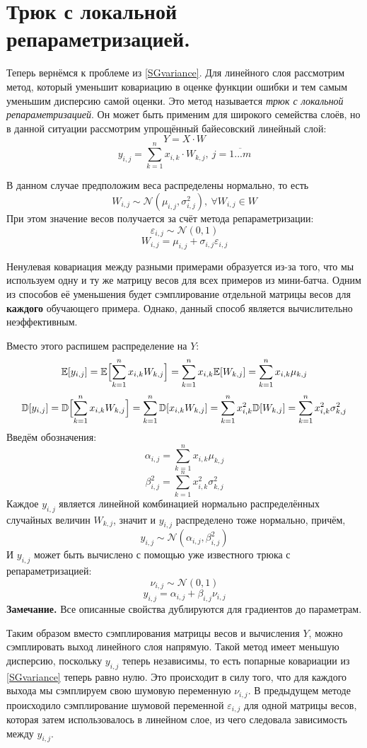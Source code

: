 \section{Трюк с локальной репараметризацией.}

Теперь вернёмся к проблеме из \ref{SGvariance}. Для линейного слоя рассмотрим метод, который уменьшит ковариацию в оценке функции ошибки и тем самым уменьшим
 дисперсию самой оценки. Это метод\cite{localRT} называется \textit{трюк с локальной репараметризацией}. Он может быть применим для широкого семейства слоёв,
 но в данной ситуации рассмотрим упрощённый байесовский линейный слой:
$$Y = X \cdot W$$
$$y_{i,j} = \sum_{k=1}^n x_{i,k} \cdot W_{k,j},\ j=\overline{1...m}$$

В данном случае предположим веса распределены нормально, то есть
$$W_{i,j} \sim \mathcal{N}(\mu_{i,j}, \sigma_{i,j}^2),\ \forall W_{i,j} \in W$$
При этом значение весов получается за счёт метода репараметризации:
$$\varepsilon_{i,j} \sim \mathcal{N}(0,1)$$
$$W_{i,j} = \mu_{i,j} + \sigma_{i,j}\varepsilon_{i,j}$$

Ненулевая ковариация между разными примерами образуется из-за того, что мы используем одну и ту же матрицу весов для всех примеров из мини-батча.
 Одним из способов её уменьшения будет сэмплирование отдельной матрицы весов для \textbf{каждого} обучающего примера. Однако, данный способ является
 вычислительно неэффективным.

Вместо этого распишем распределение на $Y$:
$$\mathbb{E}[y_{i,j}] = \mathbb{E}\Bigl[\sum_{k=1}^n x_{i,k}W_{k,j}\Bigr]=\sum_{k=1}^n x_{i,k} \mathbb{E}[W_{k,j}]=\sum_{k=1}^n x_{i,k}\mu_{k,j}$$
$$\mathbb{D}[y_{i,j}] = \mathbb{D}\Bigl[\sum_{k=1}^n x_{i,k}W_{k,j}\Bigr]=\sum_{k=1}^n \mathbb{D}[x_{i,k}W_{k,j}]=\sum_{k=1}^n x_{i,k}^2 \mathbb{D}[W_{k,j}]=\sum_{k=1}^n x_{i,k}^2\sigma_{k,j}^2$$
Введём обозначения:
$$\alpha_{i,j} = \sum_{k=1}^n x_{i,k}\mu_{k,j}$$
$$\beta_{i,j}^2 = \sum_{k=1}^n x_{i,k}^2\sigma_{k,j}^2$$
Каждое $y_{i,j}$ является линейной комбинацией нормально распределённых случайных величин $W_{k, j}$, значит и $y_{i,j}$ распределено тоже нормально, причём,
$$y_{i,j} \sim \mathcal{N}(\alpha_{i,j}, \beta_{i,j}^2)$$
И $y_{i,j}$ может быть вычислено с помощью уже известного трюка с репараметризацией:
$$\nu_{i,j} \sim \mathcal{N}(0,1)$$
$$y_{i,j}=\alpha_{i,j} + \beta_{i,j}\nu_{i,j}$$
\textbf{Замечание.} Все описанные свойства дублируются для градиентов до параметрам.

Таким образом вместо сэмплирования матрицы весов и вычисления $Y$, можно сэмплировать выход линейного слоя напрямую.
 Такой метод имеет меньшую дисперсию, поскольку $y_{i,j}$ теперь независимы, то есть попарные ковариации из \ref{SGvariance} теперь равно нулю. Это происходит в
 силу того, что для каждого выхода мы сэмплируем свою шумовую переменную $\nu_{i,j}$. В предыдущем методе происходило сэмплирование шумовой переменной $\varepsilon_{i,j}$ для одной матрицы весов,
 которая затем использовалось в линейном слое, из чего следовала зависимость между $y_{i,j}$.
